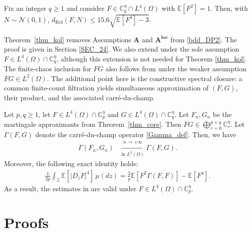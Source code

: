 \documentclass[ECP,preprint]{ejpecp}
\newcommand{\E}{\mathbb{E}}
\newcommand{\NN}{\mathcal{N}}
\newcommand{\cZ}{\mathcal{Z}}
\newcommand{\bC}{\mathbb{C}^\eta}
\newcommand{\dK}{d_{\mathrm{Kol}}}
\begin{document}
\begin{theorem}
\label{thm_kol}
Fix an integer $q\geq 1$ and consider  $F\in\bC_q\cap L^4(\Omega)$ with $\E[ F^2] =1$.
Then,  with $N\sim\NN(0,1)$,
$
\dK(F, N) 
\leq  15.6
\sqrt{\E[ F^4] - 3}.$
 
\end{theorem}



Theorem~\ref{thm_kol} removes Assumptions $\mathbf A$ and
$\mathbf{A}^{\textbf{loc}}$ from \eqref{bdd_DP2}.
The proof is given in Section \ref{SEC_24}.
We also extend \cite[Lemma 3.2]{DP18} under the sole
assumption $F\in L^4(\Omega)\cap\bC_q$, although this
extension is not needed for Theorem \ref{thm_kol}.
The finite-chaos inclusion for $FG$ also follows from
\cite[Corollary~5.3]{CP25} under the weaker assumption
$FG\in L^2(\Omega)$.
The additional point here is the constructive spectral
closure: a common finite-count filtration yields
simultaneous approximation of $(F, G)$, their product,
and the associated carr\'e-du-champ.




\begin{proposition}
\label{prop_DP}
Let $p, q\geq1$, let $F\in L^4(\Omega)\cap \bC_p$ and $G\in L^4(\Omega)\cap \bC_q$.
Let $F_n, G_n$ be the
 martingale approximants from
Theorem~\ref{thm_core}.  Then
 $ FG\in\bigoplus_{r=0}^{p+q}\bC_r.$
Let $\Gamma(F, G)$ denote the carr\'e-du-champ operator \eqref{Gamma_def}.
Then, we have
\begin{align}
  \Gamma(F_n, G_n)&\xrightarrow[\text{in }L^2(\Omega)]{n\to+\infty}\Gamma(F,G).
  \label{gam_cvg}
\end{align}
Moreover, the following  exact identity holds:
\begin{align}
  \frac1{2p}
  \int_\cZ\E[|D_zF|^4] \,\mu(dz)
  =\frac{3}{p}\E[F^2\Gamma(F,F)]-\E[F^4].
  \label{D4_id}
\end{align}
As a result,  the  estimates in
\cite[Lemma 3.2]{DP18} are valid under 
$F\in L^4(\Omega)\cap\bC_p$.
\end{proposition}

 
  
 
 
 

\section{Proofs}
\label{SEC2}
\end{document}
